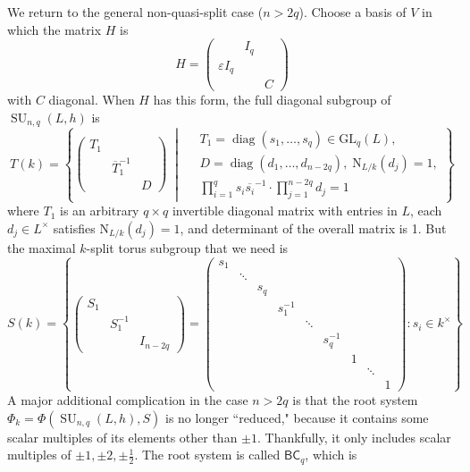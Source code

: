 \documentclass[12pt]{article}
\theoremstyle{definition}
\newcommand{\eps}{\varepsilon}
\newcommand{\lb}{\left\{}
\newcommand{\rb}{\right\}}
\newcommand{\noi}{\noindent}
\newcommand{\inv}{^{-1}}
\DeclareMathOperator{\SU}{SU}
\begin{document}
\noi We return to the general non-quasi-split case ($n > 2q$). Choose a basis of $V$ in which the matrix $H$ is
\[
	H = 
	\begin{pmatrix}
	 	 & I_q &  \\
		\eps I_q &  & \\
		 &  & C
	\end{pmatrix}
\]
with $C$ diagonal. When $H$ has this form, the full diagonal subgroup of $\SU_{n,q}(L,h)$ is
\[
	T(k) = \left\{  
	\begin{pmatrix} 
	T_1 & & \\ & \overline{T}_1^{-1} & \\ & & D  
	\end{pmatrix} 
	\;\middle\vert{}\;
		\begin{aligned} 	
			&T_1 = \operatorname{diag}(s_1, \dots, s_q) \in \mathrm{GL}_q(L), \\
			&D = \operatorname{diag}(d_1, \dots, d_{n-2q}), \; \mathrm{N}_{L/k}(d_j) = 1, \\ 	
			&\prod_{i=1}^q s_i \overline{s_i}^{-1} \cdot \prod_{j=1}^{n-2q} d_j = 1 
		\end{aligned} 
	\right\}
\]
where $T_1$ is an arbitrary $q \times q$ invertible diagonal matrix with entries in $L$, each $d_j \in L^\times$ satisfies $\mathrm{N}_{L/k}(d_j) = 1$, and determinant of the overall matrix is 1. But the maximal $k$-split torus subgroup that we need is
\[
	S(k) =
	\lb
	\begin{pmatrix}
		S_1 \\
		& S_1 \inv \\
		&& I_{n-2q}
	\end{pmatrix}
	=
	\begin{pmatrix}
		s_1 \\
		& \ddots \\
		&& s_q \\
		&&& s_1 \inv \\
		&&&& \ddots \\
		&&&&& s_q \inv \\
		&&&&&& 1 \\ 
		&&&&&&& \ddots \\
		&&&&&&&& 1
	\end{pmatrix}
	: s_i \in k^\times
	\rb
\]
A major additional complication in the case $n > 2q$ is that the root system $\Phi_k = \Phi(\SU_{n,q}(L,h), S)$ is no longer ``reduced," because it contains some scalar multiples of its elements other than $\pm 1$. Thankfully, it only includes scalar multiples of $\pm 1, \pm 2, \pm \frac 12$. The root system is called $\mathsf{BC}_q$, which is
\end{document}
